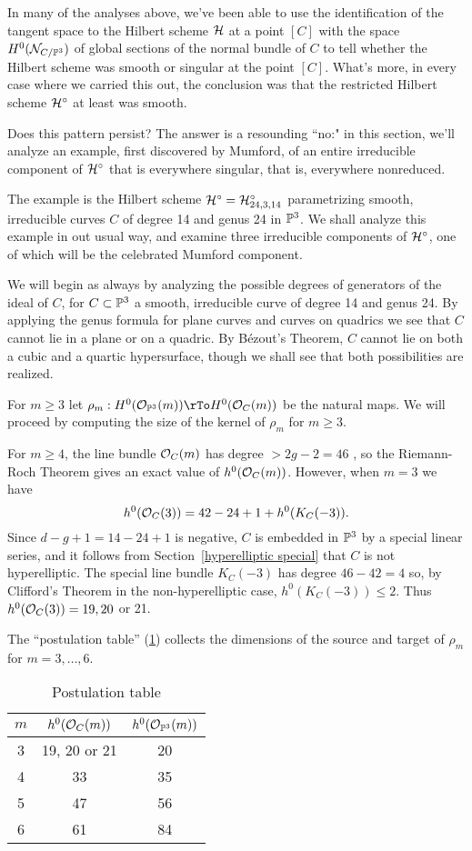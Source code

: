 In many of the analyses above, we've been able to use the identification of the tangent space to the Hilbert scheme $\cH$ at a point $[C]$ with the space $H^0(\cN_{C/\PP^3})$ of global sections of the normal bundle of $C$ to tell whether the Hilbert scheme was smooth or singular at the point $[C]$. What's more, in every case where we carried this out, the conclusion was that the restricted Hilbert scheme $\cH^\circ$ at least was smooth.

Does this pattern persist? The answer is a resounding ``no:" in this section, we'll analyze an example, first discovered by Mumford, of an entire irreducible component of $\cH^\circ$ that is everywhere singular, that is, everywhere nonreduced.


The example is the  Hilbert scheme
$\cH^\circ = \cH^\circ_{24,3,14}$ parametrizing smooth, irreducible curves $C$ of degree 14 and genus 24 in $\PP^3$. We shall analyze this example in out usual way, and examine three irreducible components of $\cH^\circ$, one of which will be the celebrated Mumford component. 

We will begin as always by analyzing the possible degrees of generators of the ideal of $C$, for $C \subset \PP^3$ a smooth, irreducible curve of degree 14 and genus 24. By applying the genus formula for plane curves and curves on quadrics we see that $C$ cannot lie in a plane or on a quadric. By B\'ezout's Theorem, $C$ cannot lie on both a cubic and a quartic hypersurface, though we shall see that both possibilities are realized.

For $m\geq 3$ let
$
\rho_m : H^0(\cO_{\PP^3}(m)) \rTo H^0(\cO_C(m))
$
be the natural maps.
We will proceed by computing the size of the kernel of $\rho_m$ for $m\geq 3$.

For $m \geq 4$, the line bundle $\cO_C(m)$ has degree $>2g-2 = 46$ , so the Riemann-Roch Theorem gives an exact value of $h^0(\cO_C(m))$.
However, when $m= 3$ we have 
$$
h^0(\cO_C(3)) = 42-24+1+h^0(K_C(-3)).
$$
Since $d-g+1 = 14-24+1$ is negative, $C$ is embedded in $\PP^3$ by a special linear series, and it follows from Section~\ref{hyperelliptic special} that $C$ is not hyperelliptic. The special line bundle $K_C(-3)$ has degree $46-42 = 4$ so,
by Clifford's Theorem in the non-hyperelliptic case, $h^0(K_C(-3)) \leq 2$. Thus $h^0(\cO_C(3)) = 19, 20$ or 21.

 The ``postulation table'' (\ref{postulation table})
collects the dimensions of the source and target of  $\rho_m$ for $m = 3, \dots, 6$. 
\begin{table}\label{postulation table}
\begin{center}\begin{tabular}{ c | c | c }
 $m$ & $h^0(\cO_C(m))$ & $h^0(\cO_{\PP^3}(m))$ \\
 \hline
 3 & 19, 20 or 21 & 20 \\
 4 & 33 & 35 \\
 5 & 47 & 56 \\
 6 & 61 & 84
\end{tabular}
\end{center}
\caption{Postulation table\label{postulation table}}
\end{table}

